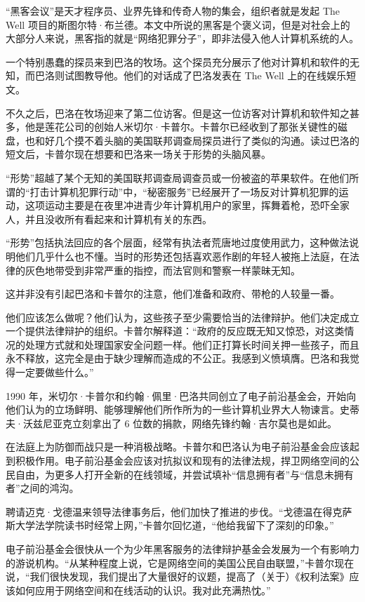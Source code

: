\documentclass[12pt,UTF8]{ctexbook}
\begin{document}
“黑客会议”是天才程序员、业界先锋和传奇人物的集会，组织者就是发起 The Well 项目的斯图尔特·布兰德。本文中所说的黑客是个褒义词，但是对社会上的大部分人来说，黑客指的就是“网络犯罪分子”，即非法侵入他人计算机系统的人。

一个特别愚蠢的探员来到巴洛的牧场。这个探员充分展示了他对计算机和软件的无知，而巴洛则试图教导他。他们的对话成了巴洛发表在 The Well 上的在线娱乐短文。

不久之后，巴洛在牧场迎来了第二位访客。但是这一位访客对计算机和软件知之甚多，他是莲花公司的创始人米切尔·卡普尔。卡普尔已经收到了那张关键性的磁盘，也和好几个摸不着头脑的美国联邦调查局探员进行了类似的沟通。读过巴洛的短文后，卡普尔现在想要和巴洛来一场关于形势的头脑风暴。

“形势”超越了某个无知的美国联邦调查局调查员或一份被盗的苹果软件。在他们所谓的“打击计算机犯罪行动”中，“秘密服务”已经展开了一场反对计算机犯罪的运动，这项运动主要是在夜里冲进青少年计算机用户的家里，挥舞着枪，恐吓全家人，并且没收所有看起来和计算机有关的东西。

“形势”包括执法回应的各个层面，经常有执法者荒唐地过度使用武力，这种做法说明他们几乎什么也不懂。当时的形势还包括喜欢恶作剧的年轻人被拖上法庭，在法律的灰色地带受到非常严重的指控，而法官则和警察一样蒙昧无知。

这并非没有引起巴洛和卡普尔的注意，他们准备和政府、带枪的人较量一番。

他们应该怎么做呢？他们认为，这些孩子至少需要恰当的法律辩护。他们决定成立一个提供法律辩护的组织。卡普尔解释道：“政府的反应既无知又惊恐，对这类情况的处理方式就和处理国家安全问题一样。他们正打算长时间关押一些孩子，而且永不释放，这完全是由于缺少理解而造成的不公正。我感到义愤填膺。巴洛和我觉得一定要做些什么。”

1990 年，米切尔·卡普尔和约翰·佩里·巴洛共同创立了电子前沿基金会，开始向他们认为的立场鲜明、能够理解他们所作所为的一些计算机业界大人物谏言。史蒂夫·沃兹尼亚克立刻拿出了 6 位数的捐款，网络先锋约翰·吉尔莫也是如此。

在法庭上为防御而战只是一种消极战略。卡普尔和巴洛认为电子前沿基金会应该起到积极作用。电子前沿基金会应该对抗拟议和现有的法律法规，捍卫网络空间的公民自由，为更多人打开全新的在线领域，并尝试填补“信息拥有者”与“信息未拥有者”之间的鸿沟。

聘请迈克·戈德温来领导法律事务后，他们加快了推进的步伐。“戈德温在得克萨斯大学法学院读书时经常上网，”卡普尔回忆道，“他给我留下了深刻的印象。”

电子前沿基金会很快从一个为少年黑客服务的法律辩护基金会发展为一个有影响力的游说机构。“从某种程度上说，它是网络空间的美国公民自由联盟，”卡普尔现在说，“我们很快发现，我们提出了大量很好的议题，提高了（关于）《权利法案》应该如何应用于网络空间和在线活动的认识。我对此充满热忱。”
\end{document}
